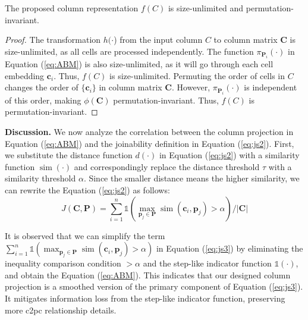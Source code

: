 
\begin{myThm}
    The proposed column representation $f(C)$ is size-unlimited  and permutation-invariant.
\end{myThm}

\begin{proof}
   The  transformation $h(\cdot$) from the input column $C$ to column matrix $\mathbf{C}$ is size-unlimited, as all cells are processed independently. The function $\pi_{\mathbf{P}_i} (\cdot)$ in Equation (\ref{eq:ABM}) is also size-unlimited, as it will go through each cell embedding $\mathbf{c}_i$. Thus, $f(C)$ is size-unlimited.
    Permuting the order of cells in $C$ changes the order of $\{\mathbf{c}_i\}$ in column matrix $\mathbf{C}$. However, $\pi_{\mathbf{P}_i} (\cdot)$ is independent of this order,  making $\phi(\mathbf{C})$ permutation-invariant. Thus, $f(C)$ is permutation-invariant.
\end{proof}

\noindent \textbf{Discussion.}
We now analyze the correlation between the column projection in Equation (\ref{eq:ABM}) and the joinability definition in Equation (\ref{eq:js2}).
First, we substitute the distance function $d(\cdot)$ in Equation (\ref{eq:js2}) with a similarity function $\operatorname{sim}(\cdot)$ and correspondingly replace the distance threshold $\tau$ with a similarity threshold $\alpha$. Since the smaller distance means the higher similarity, we can rewrite the Equation (\ref{eq:js2}) as follows:
\begin{equation}
\label{eq:js3}
    J(\mathbf{C}, \mathbf{P})= \sum_{i=1}^n \mathds{1}\left(\max _{\mathbf{p}_j \in \mathbf{P}}  \operatorname{sim}\left(\mathbf{c}_i, \mathbf{p}_j\right)>\alpha\right) /|\mathbf{C}|
\end{equation}

It is observed that we can simplify 
the term $\sum_{i=1}^n \mathds{1}\left(\max _{\mathbf{p}_j \in \mathbf{P}}  \operatorname{sim}\left(\mathbf{c}_i, \mathbf{p}_j\right)>\alpha\right)$ in Equation (\ref{eq:js3}) by eliminating the inequality comparison condition $> \alpha$ and the step-like indicator function $\mathds{1}(\cdot)$, and obtain the Equation (\ref{eq:ABM}).
This indicates that our designed column projection is a
smoothed version of the primary component of Equation (\ref{eq:js3}).
It mitigates information loss from the step-like indicator function, preserving more c2pc relationship details.
 

